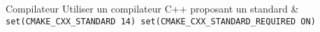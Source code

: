 \documentclass[10pt,english,landscape]{article}
\makeatletter
\renewcommand{\section}{\@startsection{section}{1}{0mm}%
{-1ex plus -.5ex minus -.2ex}%
{0.5ex plus .2ex}%
{\normalfont\large\bfseries}}
\makeatother
\begin{document}
\begin{multicols}{2}
    \begin{keys}{Compilateur}
      Utiliser un compilateur C++ proposant un standard  &
      \texttt{set(CMAKE\_CXX\_STANDARD 14)
        set(CMAKE\_CXX\_STANDARD\_REQUIRED ON)} \\
    \end{keys}
%
%
%
%
%
%
%

  \end{multicols}

  
\end{document}
